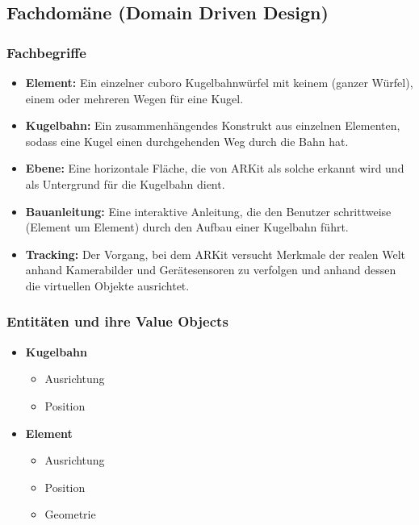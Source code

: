 \subsection{Fachdomäne (Domain Driven Design)}

\subsubsection{Fachbegriffe}
\begin{itemize}
	\item \textbf{Element:} Ein einzelner cuboro Kugelbahnwürfel mit keinem (ganzer Würfel), einem oder mehreren Wegen für eine Kugel.
	\item \textbf{Kugelbahn:} Ein zusammenhängendes Konstrukt aus einzelnen Elementen, sodass eine Kugel einen durchgehenden Weg durch die Bahn hat.
	\item \textbf{Ebene:} Eine horizontale Fläche, die von ARKit als solche erkannt wird und als Untergrund für die Kugelbahn dient.
	\item \textbf{Bauanleitung:} Eine interaktive Anleitung, die den Benutzer schrittweise (Element um Element) durch den Aufbau einer Kugelbahn führt.
	\item \textbf{Tracking:} Der Vorgang, bei dem ARKit versucht Merkmale der realen Welt anhand Kamerabilder und Gerätesensoren zu verfolgen und anhand dessen die virtuellen Objekte ausrichtet.
\end{itemize}

\subsubsection{Entitäten und ihre Value Objects}
\begin{itemize}
	\item \textbf{Kugelbahn}
	\begin{itemize}
		\item Ausrichtung
		\item Position
	\end{itemize}
	\item \textbf{Element}
	\begin{itemize}
		\item Ausrichtung
		\item Position
		\item Geometrie
	\end{itemize}
\end{itemize}

